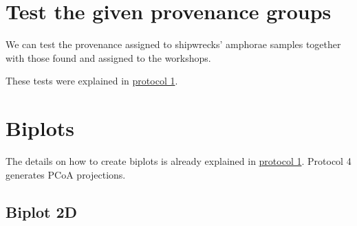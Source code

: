\documentclass[12pt,]{book}
\newenvironment{Shaded}{\begin{snugshade}}{\end{snugshade}}
\newcommand{\CommentTok}[1]{\textcolor[rgb]{0.56,0.35,0.01}{\textit{#1}}}
\newcommand{\KeywordTok}[1]{\textcolor[rgb]{0.13,0.29,0.53}{\textbf{#1}}}
\newcommand{\NormalTok}[1]{#1}
\newcommand{\OperatorTok}[1]{\textcolor[rgb]{0.81,0.36,0.00}{\textbf{#1}}}
\newcommand{\StringTok}[1]{\textcolor[rgb]{0.31,0.60,0.02}{#1}}
\begin{document}
\hypertarget{test-the-given-provenance-groups-2}{%
\section{Test the given provenance groups}\label{test-the-given-provenance-groups-2}}

We can test the provenance assigned to shipwrecks' amphorae samples together with those found and assigned to the workshops.

\begin{Shaded}
\end{Shaded}

These tests were explained in \href{3_prot1.html}{protocol 1}.

\pagebreak

\hypertarget{biplots-3}{%
\section{Biplots}\label{biplots-3}}

The details on how to create biplots is already explained in \protect\hyperlink{biplot}{protocol 1}. Protocol 4 generates PCoA projections.

\hypertarget{biplot-2d-4}{%
\subsection{Biplot 2D}\label{biplot-2d-4}}
\end{document}
